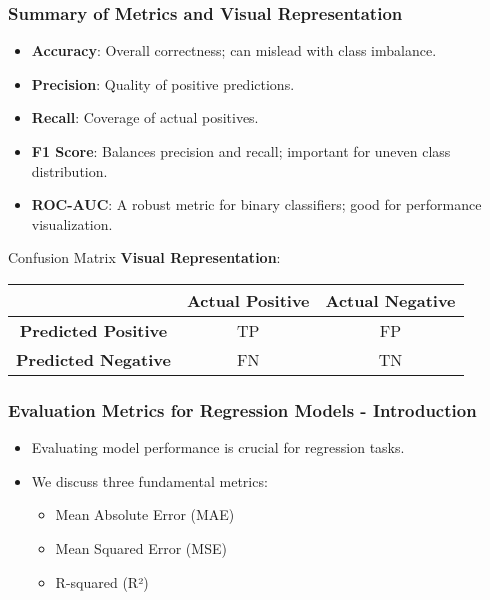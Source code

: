\documentclass[aspectratio=169]{beamer}
\begin{document}
\begin{frame}[fragile]
    \frametitle{Summary of Metrics and Visual Representation}
    \begin{itemize}
        \item \textbf{Accuracy}: Overall correctness; can mislead with class imbalance.
        \item \textbf{Precision}: Quality of positive predictions.
        \item \textbf{Recall}: Coverage of actual positives.
        \item \textbf{F1 Score}: Balances precision and recall; important for uneven class distribution.
        \item \textbf{ROC-AUC}: A robust metric for binary classifiers; good for performance visualization.
    \end{itemize}

    \begin{block}{Confusion Matrix}
        \textbf{Visual Representation}:
        \begin{center}
        \begin{tabular}{|c|c|c|}
            \hline
            & \textbf{Actual Positive} & \textbf{Actual Negative} \\
            \hline
            \textbf{Predicted Positive} & TP & FP \\
            \hline
            \textbf{Predicted Negative} & FN & TN \\
            \hline
        \end{tabular}
        \end{center}
    \end{block}
\end{frame}

\begin{frame}[fragile]
    \frametitle{Evaluation Metrics for Regression Models - Introduction}
    \begin{itemize}
        \item Evaluating model performance is crucial for regression tasks.
        \item We discuss three fundamental metrics:
        \begin{itemize}
            \item Mean Absolute Error (MAE)
            \item Mean Squared Error (MSE)
            \item R-squared (R²)
        \end{itemize}
    \end{itemize}
\end{frame}
\end{document}
